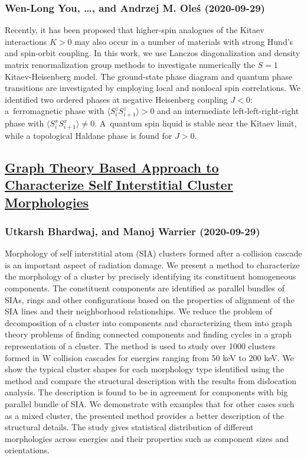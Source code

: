 \subsubsection*{Wen-Long You, \dots, and Andrzej M. Oleś (2020-09-29)}
Recently, it has been proposed that higher-spin analogues of the Kitaev
interactions $K>0$ may also occur in a number of materials with strong Hund's
and spin-orbit coupling. In this work, we use Lanczos diagonalization and
density matrix renormalization group methods to investigate numerically the
$S=1$ Kitaev-Heisenberg model. The ground-state phase diagram and quantum phase
transitions are investigated by employing local and nonlocal spin correlations.
We identified two ordered phases at negative Heisenberg coupling $J<0$:
a~ferromagnetic phase with $\langle S_i^zS_{i+1}^z\rangle>0$ and an
intermediate left-left-right-right phase with $\langle
S_i^xS_{i+1}^x\rangle\neq 0$. A~quantum spin liquid is stable near the Kitaev
limit, while a topological Haldane phase is found for $J>0$.

\subsection*{\href{http://arxiv.org/abs/2009.14147v1}{Graph Theory Based Approach to Characterize Self Interstitial Cluster  Morphologies}}
\subsubsection*{Utkarsh Bhardwaj, and Manoj Warrier (2020-09-29)}
Morphology of self interstitial atom (SIA) clusters formed after a collision
cascade is an important aspect of radiation damage. We present a method to
characterize the morphology of a cluster by precisely identifying its
constituent homogeneous components. The constituent components are identified
as parallel bundles of SIAs, rings and other configurations based on the
properties of alignment of the SIA lines and their neighborhood relationships.
We reduce the problem of decomposition of a cluster into components and
characterizing them into graph theory problems of finding connected components
and finding cycles in a graph representation of a cluster.
  The method is used to study over 1000 clusters formed in W collision cascades
for energies ranging from 50 keV to 200 keV. We show the typical cluster shapes
for each morphology type identified using the method and compare the structural
description with the results from dislocation analysis. The description is
found to be in agreement for components with big parallel bundle of SIA. We
demonstrate with examples that for other cases such as a mixed cluster, the
presented method provides a better description of the structural details. The
study gives statistical distribution of different morphologies across energies
and their properties such as component sizes and orientations.

